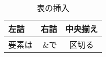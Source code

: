 \begin{table}[htpb]
  \centering
  \caption{表の挿入}
  \label{tab:table}
  \begin{tabular}{|l|r|c|} \hline
    左詰 & 右詰 & 中央揃え \\ \hline
    要素は & \&で & 区切る \\ \hline
  \end{tabular}
\end{table}
